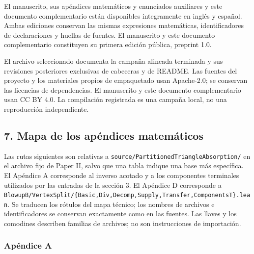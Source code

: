 \documentclass[spanish,11pt,a4paper]{article}
\begin{document}
El manuscrito, sus apéndices matemáticos y enunciados auxiliares y este documento complementario están disponibles íntegramente en inglés y español. Ambas ediciones conservan las mismas expresiones matemáticas, identificadores de declaraciones y huellas de fuentes. El manuscrito y este documento complementario constituyen su primera edición pública, preprint 1.0.

El archivo seleccionado documenta la campaña alineada terminada y sus revisiones posteriores exclusivas de cabeceras y de README. Las fuentes del proyecto y los materiales propios de empaquetado usan Apache-2.0; se conservan las licencias de dependencias. El manuscrito y este documento complementario usan CC BY 4.0. La compilación registrada es una campaña local, no una reproducción independiente.


\subsection{7. Mapa de los apéndices matemáticos}\label{mapa-de-los-apuxe9ndices-matemuxe1ticos}

Las rutas siguientes son relativas a \texttt{source/\allowbreak{}Parti\allowbreak{}tioned\allowbreak{}Triang\allowbreak{}le\allowbreak{}Absorption\allowbreak{}/\allowbreak{}} en el archivo fijo de Paper II, salvo que una tabla indique una base más específica. El Apéndice A corresponde al inverso acotado y a los componentes terminales utilizados por las entradas de la sección 3. El Apéndice D corresponde a \texttt{Blowup\allowbreak{}B/\allowbreak{}Vert\allowbreak{}ex\allowbreak{}Split/\allowbreak{}\{\allowbreak{}Bas\allowbreak{}ic,\allowbreak{}Div,\allowbreak{}Decom\allowbreak{}p,\allowbreak{}Supply,\allowbreak{}Tra\allowbreak{}nsfer,\allowbreak{}Compon\allowbreak{}ents\allowbreak{}T\}\allowbreak{}.\allowbreak{}lean}. Se traducen los rótulos del mapa técnico; los nombres de archivos e identificadores se conservan exactamente como en las fuentes. Las llaves y los comodines describen familias de archivos; no son instrucciones de importación.

\subsubsection{Apéndice A}\label{apuxe9ndice-a}
\end{document}
